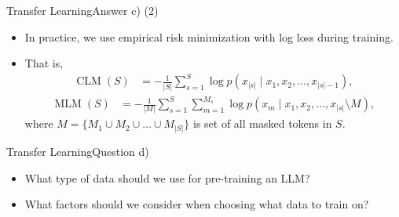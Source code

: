 \documentclass[t]{beamer}
\newcommand\op[1]{\operatorname{#1}}
\begin{document}
\begin{frame}{Transfer Learning}{Answer c) (2)}
    \begin{itemize}
        \item In practice, we use empirical risk minimization with log loss during
              training.
        \item That is,
              \begin{align}
                  \op{CLM}(S) & = - \frac{1}{|S|} \sum_{s=1}^{S} \log p(x_{|s|} \mid x_1, x_2, \ldots, x_{|s|-1}),
              \end{align}
              \begin{align}
                  \op{MLM}(S) & = - \frac{1}{|M|} \sum_{s=1}^{S} \sum_{m=1}^{M_s} \log p(x_m \mid x_1, x_2, \ldots, x_{|s|} \setminus M),
              \end{align}
              where $M = \{M_1 \cup M_2 \cup \ldots \cup M_{|S|}\}$ is set of
              all masked tokens in $S$.
    \end{itemize}
\end{frame}

\begin{frame}{Transfer Learning}{Question d)}
    \begin{itemize}
        \item What type of data should we use for pre-training an LLM?
        \item What factors should we consider when choosing what data to train
              on?
    \end{itemize}
\end{frame}
\end{document}
